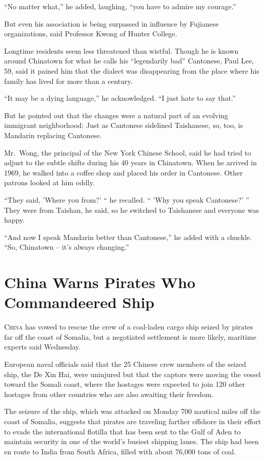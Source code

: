 ﻿\documentclass[12pt]{article}
\begin{document}
``No matter what,'' he added, laughing, ``you have to admire my courage.''

But even his association is being surpassed in influence by Fujianese organizations, said Professor
Kwong of Hunter College.

Longtime residents seem less threatened than wistful. Though he is known around Chinatown for what
he calls his ``legendarily bad'' Cantonese, Paul Lee, 59, said it pained him that the dialect was
disappearing from the place where his family has lived for more than a century.

``It may be a dying language,'' he acknowledged. ``I just hate to say that.''

But he pointed out that the changes were a natural part of an evolving immigrant neighborhood: Just
as Cantonese sidelined Taishanese, so, too, is Mandarin replacing Cantonese.

Mr.~Wong, the principal of the New York Chinese School, said he had tried to adjust to the subtle
shifts during his 40 years in Chinatown. When he arrived in 1969, he walked into a coffee shop and
placed his order in Cantonese. Other patrons looked at him oddly.

``They said, 'Where you from?' `` he recalled. `` 'Why you speak Cantonese?' '' They were from
Taishan, he said, so he switched to Taishanese and everyone was happy.

``And now I speak Mandarin better than Cantonese,'' he added with a chuckle. ``So, Chinatown -- it's
always changing.''

\section{China Warns Pirates Who Commandeered Ship}

\lettrine{C}{hina} has vowed to rescue the crew of a coal-laden cargo ship
seized by pirates far off the coast of Somalia, but a negotiated settlement is more likely, maritime
experts said Wednesday.

European naval officials said that the 25 Chinese crew members of the seized ship, the De Xin Hai,
were uninjured but that the captors were moving the vessel toward the Somali coast, where the
hostages were expected to join 120 other hostages from other countries who are also awaiting their
freedom.

The seizure of the ship, which was attacked on Monday 700 nautical miles off the coast of Somalia,
suggests that pirates are traveling farther offshore in their effort to evade the international
flotilla that has been sent to the Gulf of Aden to maintain security in one of the world's busiest
shipping lanes. The ship had been en route to India from South Africa, filled with about 76,000 tons
of coal.
\end{document}

